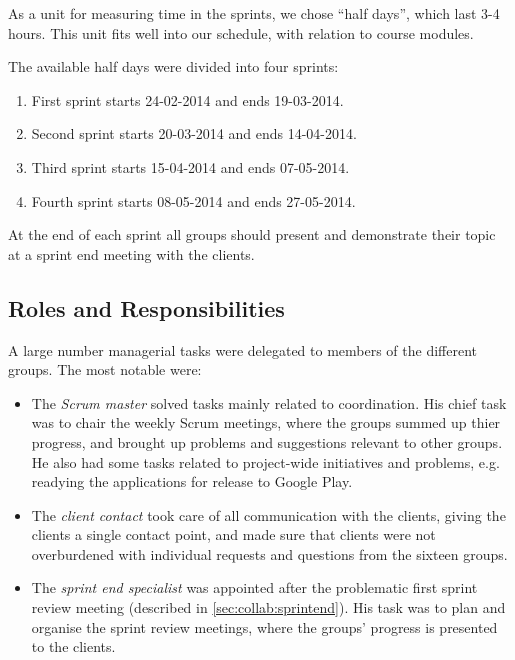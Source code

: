 As a unit for measuring time in the sprints, we chose ``half days'', which last 3-4 hours. This unit fits well into our schedule, with relation to course modules.

The available half days were divided into four sprints:

\begin{enumerate}
\item First sprint starts 24-02-2014 and ends 19-03-2014.
\item Second sprint starts 20-03-2014 and ends 14-04-2014.
\item Third sprint starts 15-04-2014 and ends 07-05-2014.
\item Fourth sprint starts 08-05-2014 and ends 27-05-2014.
\end{enumerate}

At the end of each sprint all groups should present and demonstrate their topic at a sprint end meeting with the clients.

\subsection{Roles and Responsibilities}
A large number managerial tasks were delegated to members of the different groups. The most notable were:
\begin{itemize}
	\item The \textit{Scrum master} solved tasks mainly related to coordination. His chief task was to chair the weekly Scrum meetings, where the groups summed up thier progress, and brought up problems and suggestions relevant to other groups. He also had some tasks related to project-wide initiatives and problems, e.g. readying the applications for release to Google Play.
	\item The \textit{client contact} took care of all communication with the clients, giving the clients a single contact point, and made sure that clients were not overburdened with individual requests and questions from the sixteen groups. 
	\item The \textit{sprint end specialist} was appointed after the problematic first sprint review meeting (described in \cref{sec:collab:sprintend}). His task was to plan and organise the sprint review meetings, where the groups' progress is presented to the clients.
\end{itemize}

